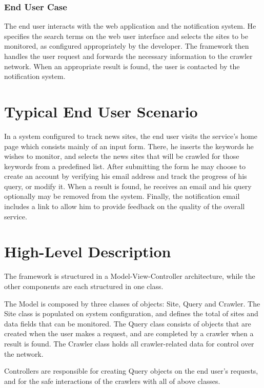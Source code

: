 \documentclass[a4paper,10pt]{article} \usepackage{anysize}
\begin{document}
    \subsubsection{End User Case}
        The end user interacts with the web application and the
        notification system. He specifies the search terms on the web user
        interface and selects the sites to be monitored, as configured
        appropriately by the developer. The framework then handles the
        user request and forwards the necessary information to the crawler
        network. When an appropriate result is found, the user is
        contacted by the notification system. 

\section{Typical End User Scenario}
    In a system configured to track news sites, the end user visits the
    service's home page which consists mainly of an input form. There, he
    inserts the keywords he wishes to monitor, and selects the news sites that
    will be crawled for those keywords from a predefined list. After submitting
    the form he may choose to create an account by verifying his email address
    and track the progress of his query, or modify it. When a result is found,
    he receives an email and his query optionally may be removed from the
    system. Finally, the notification email includes a link to allow him to
    provide feedback on the quality of the overall service.

\section{High-Level Description}
    The framework is structured in a Model-View-Controller architecture, while
    the other components are each structured in one class.

    The Model is composed by three classes of objects: Site, Query and Crawler.
    The Site class is populated on system configuration, and defines the total
    of sites and data fields that can be monitored. The Query class consists of
    objects that are created when the user makes a request, and are completed
    by a crawler when a result is found. The Crawler class holds all
    crawler-related data for control over the network. 
    
    Controllers are responsible for creating Query objects on the end user's
    requests, and for the safe interactions of the crawlers with all of above
    classes. 
    
\end{document}
